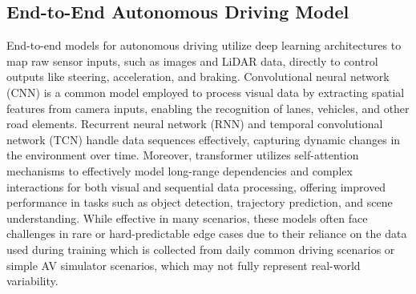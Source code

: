 \subsection{End-to-End Autonomous Driving Model}
End-to-end models for autonomous driving utilize deep learning architectures to map raw sensor inputs, such as images and LiDAR data, directly to control outputs like steering, acceleration, and braking. Convolutional neural network (CNN) is a common model employed to process visual data by extracting spatial features from camera inputs, enabling the recognition of lanes, vehicles, and other road elements\cite{sharma2023cnn, alsanwy2023cnn}. Recurrent neural network (RNN) and temporal convolutional network (TCN) handle data sequences effectively, capturing dynamic changes in the environment over time\cite{Du2021Imitation}. Moreover, transformer utilizes self-attention mechanisms to effectively model long-range dependencies and complex interactions for both visual and sequential data processing\cite{rayakota2024hybridte, chen2023detrive}, offering improved performance in tasks such as object detection, trajectory prediction, and scene understanding\cite{Li2023Lane}. While effective in many scenarios, these models often face challenges in rare or hard-predictable edge cases due to their reliance on the data used during training which is collected from daily common driving scenarios or simple AV simulator scenarios\cite{10605806}, which may not fully represent real-world variability.

